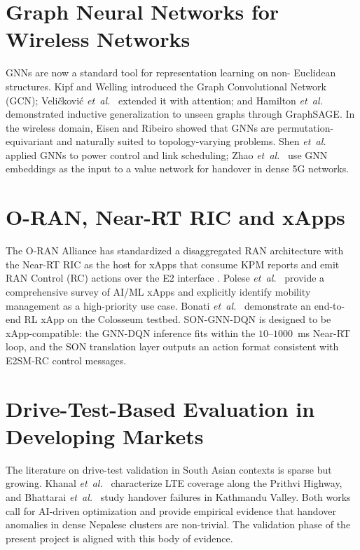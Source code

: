 \documentclass[12pt,a4paper,oneside]{report}
\begin{document}
\section{Graph Neural Networks for Wireless Networks}

GNNs are now a standard tool for representation learning on non-
Euclidean structures. Kipf and Welling \cite{kipf_gcn} introduced the
Graph Convolutional Network (GCN); Veli\v{c}kovi\'c
\textit{et~al.}~\cite{velickovic_gat} extended it with attention; and
Hamilton \textit{et~al.}~\cite{hamilton_graphsage} demonstrated
inductive generalization to unseen graphs through GraphSAGE. In the
wireless domain, Eisen and Ribeiro \cite{eisen_random_graphs_2020}
showed that GNNs are permutation-equivariant and naturally suited to
topology-varying problems. Shen
\textit{et~al.}~\cite{shen_gnn_resource_2021} applied GNNs to power
control and link scheduling; Zhao
\textit{et~al.}~\cite{zhao_gnn_handover} use GNN embeddings as the
input to a value network for handover in dense 5G networks.

\section{O-RAN, Near-RT RIC and xApps}

The O-RAN Alliance has standardized a disaggregated RAN architecture
with the Near-RT RIC as the host for xApps that consume KPM reports and
emit RAN Control (RC) actions over the E2 interface
\cite{oran_alliance_wg2}. Polese
\textit{et~al.}~\cite{polese_oran_survey} provide a comprehensive
survey of AI/ML xApps and explicitly identify mobility management as a
high-priority use case. Bonati \textit{et~al.}~\cite{bonati_colosseum}
demonstrate an end-to-end RL xApp on the Colosseum testbed. SON-GNN-DQN
is designed to be xApp-compatible: the GNN-DQN inference fits within the
$10$--$1000$~ms Near-RT loop, and the SON translation layer outputs an
action format consistent with E2SM-RC control messages.

\section{Drive-Test-Based Evaluation in Developing Markets}

The literature on drive-test validation in South Asian contexts is
sparse but growing. Khanal \textit{et~al.}~\cite{khanal_nepal}
characterize LTE coverage along the Prithvi Highway, and Bhattarai
\textit{et~al.}~\cite{bhattarai_kathmandu} study handover failures in
Kathmandu Valley. Both works call for AI-driven optimization and
provide empirical evidence that handover anomalies in dense Nepalese
clusters are non-trivial. The validation phase of the present project is
aligned with this body of evidence.
\end{document}

